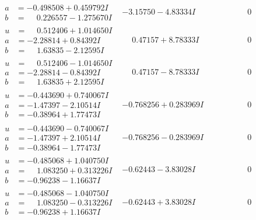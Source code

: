 \documentclass[1p]{elsarticle_modified}
\theoremstyle{definition}
\begin{document}
$$\begin{array}{c|c|c}
\begin{aligned}
a &= -0.498508 + 0.459792 I \\
b &= \phantom{-}0.226557 - 1.275670 I\end{aligned}
 & -3.15750 - 4.83334 I & \phantom{-0.000000 } 0 \\ \hline\begin{aligned}
u &= \phantom{-}0.512406 + 1.014650 I \\
a &= -2.28814 + 0.84392 I \\
b &= \phantom{-}1.63835 - 2.12595 I\end{aligned}
 & \phantom{-}0.47157 + 8.78333 I & \phantom{-0.000000 } 0 \\ \hline\begin{aligned}
u &= \phantom{-}0.512406 - 1.014650 I \\
a &= -2.28814 - 0.84392 I \\
b &= \phantom{-}1.63835 + 2.12595 I\end{aligned}
 & \phantom{-}0.47157 - 8.78333 I & \phantom{-0.000000 } 0 \\ \hline\begin{aligned}
u &= -0.443690 + 0.740067 I \\
a &= -1.47397 - 2.10514 I \\
b &= -0.38964 + 1.77473 I\end{aligned}
 & -0.768256 + 0.283969 I & \phantom{-0.000000 } 0 \\ \hline\begin{aligned}
u &= -0.443690 - 0.740067 I \\
a &= -1.47397 + 2.10514 I \\
b &= -0.38964 - 1.77473 I\end{aligned}
 & -0.768256 - 0.283969 I & \phantom{-0.000000 } 0 \\ \hline\begin{aligned}
u &= -0.485068 + 1.040750 I \\
a &= \phantom{-}1.083250 + 0.313226 I \\
b &= -0.96238 - 1.16637 I\end{aligned}
 & -0.62443 - 3.83028 I & \phantom{-0.000000 } 0 \\ \hline\begin{aligned}
u &= -0.485068 - 1.040750 I \\
a &= \phantom{-}1.083250 - 0.313226 I \\
b &= -0.96238 + 1.16637 I\end{aligned}
 & -0.62443 + 3.83028 I & \phantom{-0.000000 } 0 \\ \hline\begin{aligned}

\end{aligned}
\end{array}$$
\end{document}
